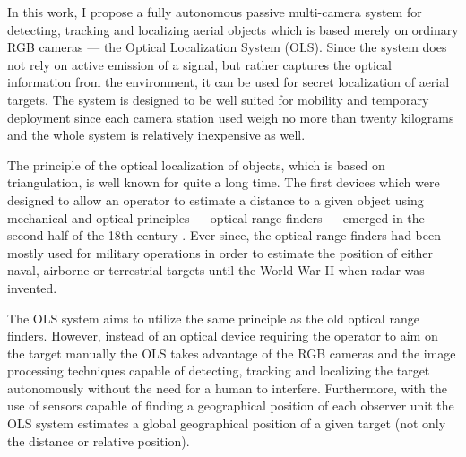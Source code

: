 In this work, I propose a fully autonomous passive multi-camera system for detecting, tracking and localizing aerial objects which is based merely on ordinary RGB cameras --- the Optical Localization System (OLS). Since the system does not rely on active emission of a signal, but rather captures the optical information from the environment, it can be used for secret localization of aerial targets. The system is designed to be well suited for mobility and temporary deployment since each camera station used weigh no more than twenty kilograms and the whole system is relatively inexpensive as well.




The principle of the optical localization of objects, which is based on triangulation, is well known for quite a long time. The first devices which were designed to allow an operator to estimate a distance to a given object using mechanical and optical principles --- optical range finders --- emerged in the second half of the 18th century \cite{bud1998instruments}. Ever since, the optical range finders had been mostly used for military operations in order to estimate the position of either naval, airborne or terrestrial targets until the World War II when radar was invented.

The OLS system aims to utilize the same principle as the old optical range finders. However, instead of an optical device requiring the operator to aim on the target manually the OLS takes advantage of the RGB cameras and the image processing techniques capable of detecting, tracking and localizing the target autonomously without the need for a human to interfere. Furthermore, with the use of sensors capable of finding a geographical position of each observer unit the OLS system estimates a global geographical position of a given target (not only the distance or relative position).



